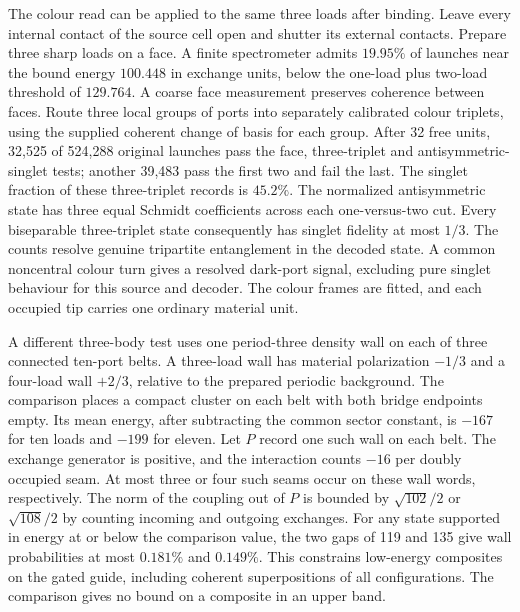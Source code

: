 \documentclass[11pt]{article}
\theoremstyle{definition}
\theoremstyle{remark}
\theoremstyle{plain}
\begin{document}
The colour read can be applied to the same three loads after binding.
Leave every internal contact of the source cell open and shutter its
external contacts. Prepare three sharp loads on a face. A finite
spectrometer admits $19.95\%$ of launches near the bound energy
$100.448$ in exchange units, below the one-load plus two-load threshold
of $129.764$. A coarse face measurement preserves coherence between
faces. Route three local groups of ports into separately calibrated
colour triplets, using the supplied coherent change of basis for each
group. After 32 free units, 32,525 of 524,288 original launches pass
the face, three-triplet and antisymmetric-singlet tests; another 39,483
pass the first two and fail the last. The singlet fraction of these
three-triplet records is $45.2\%$. The normalized antisymmetric state
has three equal Schmidt coefficients across each one-versus-two cut.
Every biseparable three-triplet state consequently has singlet fidelity
at most $1/3$. The counts resolve genuine tripartite entanglement in the
decoded state. A common noncentral colour turn gives a resolved dark-port signal,
excluding pure singlet behaviour
for this source and decoder. The colour frames are fitted, and each
occupied tip carries one ordinary material unit.

A different three-body test uses one period-three density wall on each
of three connected ten-port belts. A three-load wall has material
polarization $-1/3$ and a four-load wall $+2/3$, relative to the
prepared periodic background. The comparison places a compact cluster
on each belt with both bridge endpoints empty. Its mean energy, after
subtracting the common sector constant, is $-167$ for ten loads and
$-199$ for eleven. Let $P$ record one such wall on each belt.
The exchange generator is positive, and the interaction counts $-16$
per doubly occupied seam. At most three or four such seams occur on
these wall words, respectively. The norm of the coupling out of $P$ is
bounded by $\sqrt{102}/2$ or $\sqrt{108}/2$ by counting incoming and
outgoing exchanges. For any state supported in energy at or below the
comparison value, the two gaps of 119 and 135 give wall probabilities
at most $0.181\%$ and $0.149\%$. This constrains low-energy composites
on the gated guide, including coherent superpositions of all configurations.
The comparison gives no bound on a composite in an upper band.
\end{document}
